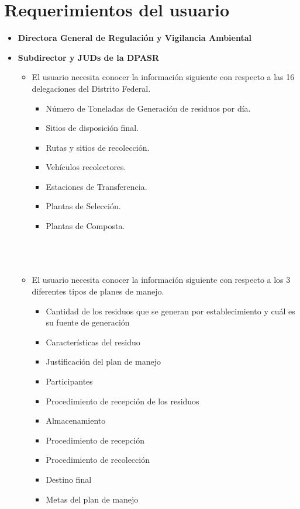 \section{Requerimientos del usuario}
\begin{itemize}
	\item \textbf{Directora General de Regulación y Vigilancia Ambiental}
	\item \textbf{Subdirector y JUDs de la DPASR}
	\begin{itemize}
		\item El usuario necesita conocer la información siguiente con respecto a las 16  delegaciones del Distrito Federal.
		\begin{itemize}
			\item Número de Toneladas de Generación de residuos por día.
			\item Sitios de disposición final.
			\item Rutas y sitios de recolección.
			\item Vehículos recolectores.
			\item Estaciones de Transferencia.
			\item Plantas de Selección.
			\item Plantas de Composta.
			\\\\\\\\
		\end{itemize}
		\item El usuario necesita conocer la información siguiente con respecto a los 3 diferentes tipos de planes de manejo.
		\begin{itemize}
			\item Cantidad de los residuos que se generan  por establecimiento y cuál es su fuente de generación
			\item Características del residuo
			\item Justificación del plan de manejo        
			\item Participantes
			\item Procedimiento de recepción  de los residuos
			\item Almacenamiento
			\item Procedimiento de recepción    
			\item Procedimiento de  recolección
			\item Destino final
			\item Metas del plan de manejo
		\end{itemize}

\end{itemize}
\end{itemize}
